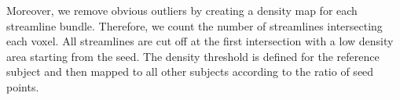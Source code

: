Moreover, we remove obvious outliers by creating a density map for each streamline
bundle. Therefore, we count the number of streamlines intersecting each voxel.
All streamlines are cut off at the first intersection with a low density
area starting from the seed. The density threshold is defined for the
reference subject and then mapped to all other subjects according to the ratio of seed points.

